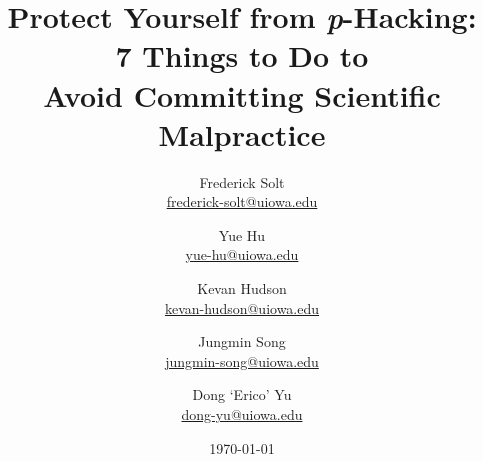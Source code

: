 \documentclass[12pt]{article}
\begin{document}
\title{Protect Yourself from \emph{p}-Hacking:\\ 7 Things to Do to\\ Avoid Committing Scientific Malpractice}		
\author{
    Frederick Solt\\
    \href{mailto:frederick-solt@uiowa.edu}{frederick-solt@uiowa.edu}
    \and
    Yue Hu\\
    \href{mailto:yue-hu@uiowa.edu}{yue-hu@uiowa.edu}
    \and
	Kevan Hudson\\
	\href{mailto:kevan-hudson@uiowa.edu}{kevan-hudson@uiowa.edu}
	\and
	Jungmin Song\\
    \href{mailto:jungmin-song@uiowa.edu}{jungmin-song@uiowa.edu}
	\and
	Dong `Erico' Yu\\
    \href{mailto:dong-yu@uiowa.edu}{dong-yu@uiowa.edu}
}
\date{\today}				
\maketitle

\begin{abstract}

\end{abstract}
\newpage


% 
% 
% 
% 
% 
% 
% 
% 

\newpage
\pagebreak



\end{document}
